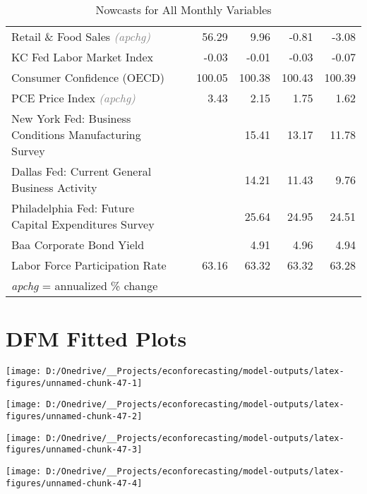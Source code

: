 \documentclass[11pt, letterpaper]{article}\usepackage[]{graphicx}\usepackage[]{color}
\begin{document}
\begin{table}[H]
\begin{tabular}{lrrrrr}
  Retail \& Food Sales \textit{\footnotesize\textcolor{gray}{(apchg)}} &  & 56.29 & 9.96 & -0.81 & -3.08 \\ 
  KC Fed Labor Market Index &  & -0.03 & -0.01 & -0.03 & -0.07 \\ 
  Consumer Confidence (OECD) &  & 100.05 & 100.38 & 100.43 & 100.39 \\ 
  PCE Price Index \textit{\footnotesize\textcolor{gray}{(apchg)}} &  & 3.43 & 2.15 & 1.75 & 1.62 \\ 
  New York Fed: Business Conditions Manufacturing Survey &  &  & 15.41 & 13.17 & 11.78 \\ 
  Dallas Fed: Current General Business Activity &  &  & 14.21 & 11.43 & 9.76 \\ 
  Philadelphia Fed: Future Capital Expenditures Survey &  &  & 25.64 & 24.95 & 24.51 \\ 
  Baa Corporate Bond Yield &  &  & 4.91 & 4.96 & 4.94 \\ 
  Labor Force Participation Rate &  & 63.16 & 63.32 & 63.32 & 63.28 \\ 
   \hline 
 \textit{apchg} = annualized \% change 
\end{tabular}
\endgroup
\caption{Nowcasts for All Monthly Variables} 
\end{table}



\appendix
\appendixpage
\addappheadtotoc

\section{DFM Fitted Plots}


{\centering \texttt{[image: D:/Onedrive/\_\_Projects/econforecasting/model-outputs/latex-figures/unnamed-chunk-47-1]} 

}




{\centering \texttt{[image: D:/Onedrive/\_\_Projects/econforecasting/model-outputs/latex-figures/unnamed-chunk-47-2]} 

}




{\centering \texttt{[image: D:/Onedrive/\_\_Projects/econforecasting/model-outputs/latex-figures/unnamed-chunk-47-3]} 

}




{\centering \texttt{[image: D:/Onedrive/\_\_Projects/econforecasting/model-outputs/latex-figures/unnamed-chunk-47-4]} 

}
\end{document}
